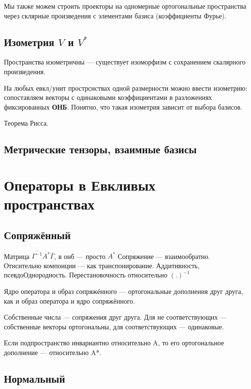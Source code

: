 \documentclass[12pt, a4paper]{article}
\begin{document}
Мы также можем строить проекторы на одномерные ортогональные пространства через склярные произведения с элементами базиса (коэффициенты Фурье).

\subsection{Изометрия $V$ и $V^{*}$}

Пространства изометричны — существует изоморфизм с сохранением скалярного произведения.

На любых евкл/унит прострснствах одной размерности можно ввести изометрию: 
сопоставляем векторы с одинаковыми коэффициентами в разложениях фиксированных \textbf{ОНБ}. 
Понятно, что такая изометрия зависит от выбора базисов.

Теорема Рисса.

\subsection{Метрические тензоры, взаимные базисы}



\section{Операторы в Евкливых пространствах}

\subsection{Сопряжённый}

Матрица $\overline{\Gamma^{-1}} A^* \overline{\Gamma}$, в онб — просто $A^*$
Сопряжение — взаимообратно.
Отнсительно компоиции — как транспонирование.
Аддитивность, псевдоОднородность.
Перестановочность относительно $(.)^{-1}$

Ядро оператора и образ сопряжённого — ортогональные дополнения друг друга, как и образ оператора и ядро сопряжённого.


Собственные числа — сопряжения друг друга.
Для не соответствующих — собственные векторы ортогональны, для соответствующих — одинаковые.

Если подпространство инвариантно относительно A, то его ортогональное дополнение — относительно A*.


\subsection{Нормальный}
\end{document}
